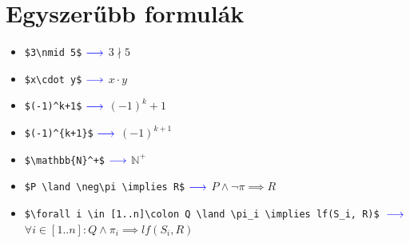 \documentclass[a4paper,12pt]{article}
\begin{document}
	\author{Zsolt Borsi}	
	\bigskip
	\bigskip

	
\section*{Egyszerűbb formulák}
\begin{itemize}
\item \verb|$3\nmid 5$| \qquad\qquad $\color{my_color}\longrightarrow$ \qquad\qquad $3\nmid 5$

\item \verb|$x\cdot y$| \qquad\qquad $\color{my_color}\longrightarrow$ \qquad\qquad $x\cdot y$

\item \verb|$(-1)^k+1$| \qquad\qquad $\color{my_color}\longrightarrow$ \qquad\qquad $(-1)^k+1$

\item \verb|$(-1)^{k+1}$| \qquad\qquad $\color{my_color}\longrightarrow$ \qquad\qquad $(-1)^{k+1}$

\item \verb|$\mathbb{N}^+$| \qquad\qquad $\color{my_color}\longrightarrow$ \qquad\qquad $\mathbb{N}^+$

\item \verb|$P \land \neg\pi \implies R$| \qquad\qquad $\color{my_color}\longrightarrow$ \qquad\qquad $P \land \neg\pi \implies R$

\item \verb|$\forall i \in [1..n]\colon Q \land \pi_i \implies lf(S_i, R)$| \qquad\qquad $\color{my_color}\\
\longrightarrow$\\
 \qquad\qquad $\forall i \in \left[ 1..n\right]: Q \land \pi_i \implies lf(S_i, R)$

\end{itemize}
\end{document}
